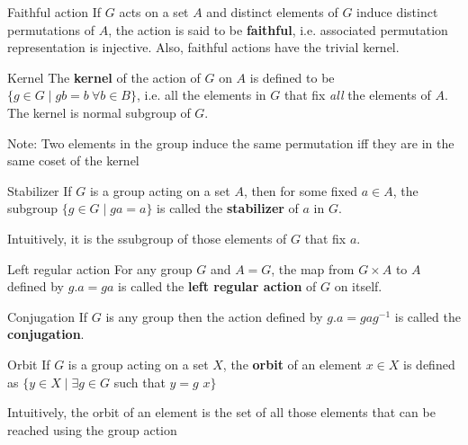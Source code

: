 \documentclass[titlepage, 12pt]{article}
\begin{document}
\begin{definition}{Faithful action}{}
If $G$ acts on a set $A$ and distinct elements of $G$ induce distinct
permutations of $A$, the action is said to be \textbf{faithful}, i.e. associated
permutation representation is injective. Also, faithful actions have the trivial
kernel.
\end{definition}

\begin{definition}{Kernel}{}
The \textbf{kernel} of the action of $G$ on $A$ is defined to be $\{g\in G\mid
gb = b\ \forall b\in B\}$, i.e. all the elements in $G$ that fix \textit{all}
the elements of $A$. The kernel is normal subgroup of $G$.
\end{definition}

Note: Two elements in the group induce the same permutation iff they are in the
same coset of the kernel

\begin{definition}{Stabilizer}{}
If $G$ is a group acting on a set $A$, then for some fixed $a\in A$, the
subgroup $\{g\in G\mid ga=a\}$ is called the \textbf{stabilizer} of $a$ in $G$.
\end{definition}

Intuitively, it is the ssubgroup of those elements of $G$ that fix $a$.

\begin{definition}{Left regular action}{}
    For any group $G$ and $A = G$, the map from $G\times A$ to $A$ defined by
    $g.a = ga$ is called the \textbf{left regular action} of $G$ on itself.
\end{definition}

\begin{definition}{Conjugation}{}
    If $G$ is any group then the action defined by $g.a = gag^{-1}$ is called
    the \textbf{conjugation}.
\end{definition}


\begin{definition}{Orbit}{}
    If $G$ is a group acting on a set $X$, the \textbf{orbit} of an element
    $x\in X$ is defined as $\{y\in X\mid\exists g\in G$ such that $y = g$ 
    $x\}$
\end{definition}
Intuitively, the orbit of an element is the set of all those elements that can
be reached using the group action
\end{document}
